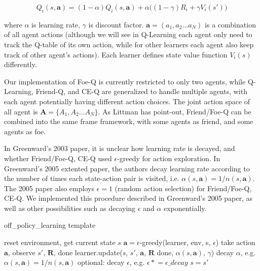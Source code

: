 \documentclass[conference]{IEEEtran}
\newcommand{\asteq}{\mathrel{*}=}
\begin{document}
\begin{equation}
Q_i(s, \mathbf{a}) = (1-\alpha) Q_i(s, \mathbf{a}) + \alpha  \big( (1-\gamma) R_i + \gamma V_i(s') \big)
\label{eq:update}
\end{equation}

where $\alpha$ is learning rate, $\gamma$ is discount factor. $\mathbf{a}=(a_1, a_2\dots a_N)$ is a combination of all agent actions (although we will see in Q-Learning each agent only need to track the Q-table of its own action, while for other learners each agent also keep track of other agent's actions). Each learner defines state value function $V_i(s)$ differently.

Our implementation of Foe-Q is currently restricted to only two agents, while Q-Learning, Friend-Q, and CE-Q are generalized to handle multiple agents, with each agent potentially having different action choices. The joint action space of all agent is $\mathbf{A}=\{A_1, A_2 \dots A_N\}$. As Littman has point-out, Friend/Foe-Q can be combined into the same frame framework, with some agents as friend, and some agents as foe\cite{littman2001friend}.

In Greenward's 2003 paper\cite{greenwald2003correlated}, it is unclear how learning rate is decayed, and whether Friend/Foe-Q, CE-Q used $\epsilon$-greedy for action exploration. In Greenward's 2005 extented paper\cite{greenwald2005correlated}, the authors decay learning rate according to the number of times each state-action pair is visited, i.e. $\alpha(s,\mathbf{a}) = 1/n(s,\mathbf{a})$. The 2005 paper also employs $\epsilon=1$ (random action selection) for Friend/Foe-Q, CE-Q. We implemented this procedure described in Greenward's 2005 paper, as well as other possibilities such as decaying $\epsilon$ and $\alpha$ exponentially.

\begin{algorithm}[h!]
	\caption{off\_policy\_learning template}
	\begin{algorithmic}
				\State reset environment, get current state $s$
					\State $\mathbf{a} = \epsilon$-greedy(learner, env, s, $\epsilon$)
					\State take action $\mathbf{a}$, observe $s'$, $\mathbf{R}$, done
					\State learner.update($s$, $s'$, $\mathbf{a}$, $\mathbf{R}$ done, $\alpha(s,\mathbf{a})$, $\gamma$)
				    \State decay $\alpha$, e.g. $\alpha(s,\mathbf{a}) = 1/n(s,\mathbf{a})$
				    \State optional: decay $\epsilon$, e.g. $\epsilon \asteq \epsilon\_decay$
				    \State $s=s'$
				\EndFor			
			\EndFor
		\EndFunction
	\end{algorithmic}
	\label{algo:learning}
\end{algorithm}
\end{document}
